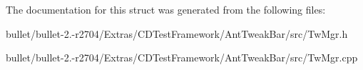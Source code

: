 The documentation for this struct was generated from the following files\+:\begin{DoxyCompactItemize}
\item 
bullet/bullet-\/2.-\/r2704/\+Extras/\+C\+D\+Test\+Framework/\+Ant\+Tweak\+Bar/src/Tw\+Mgr.\+h\item 
bullet/bullet-\/2.-\/r2704/\+Extras/\+C\+D\+Test\+Framework/\+Ant\+Tweak\+Bar/src/Tw\+Mgr.\+cpp\end{DoxyCompactItemize}
